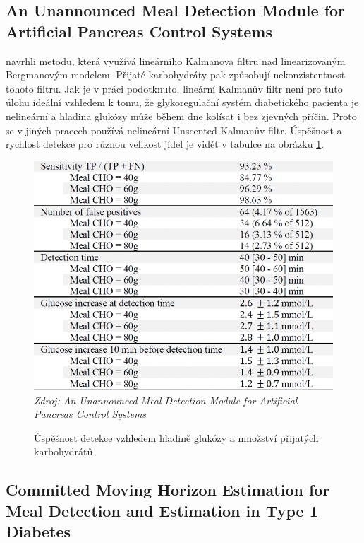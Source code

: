 \subsection{An Unannounced Meal Detection Module for Artificial Pancreas Control Systems}
\label{ch:nekonzistence}

\citet{Analyza.Nekonzistence} navrhli metodu, která využívá lineárního Kalmanova filtru nad linearizovaným Bergmanovým modelem. Přijaté karbohydráty pak způsobují nekonzistentnost tohoto filtru. Jak je v práci podotknuto, lineární Kalmanův filtr není pro tuto úlohu ideální vzhledem k tomu, že glykoregulační systém diabetického pacienta je nelineární a hladina glukózy může během dne kolísat i bez zjevných příčin. Proto se v jiných pracech používá nelineární Unscented Kalmanův filtr. Úspěšnost a rychlost detekce pro různou velikost jídel je vidět v tabulce na obrázku \ref{fig:nekonzistence}.

\begin{figure}[H]
\caption{Úspěšnost detekce vzhledem hladině glukózy a množství přijatých karbohydrátů}
\label{fig:nekonzistence}
\includegraphics[width=1\textwidth]{img/analyza/nekonzistence.png}\\
\textit{Zdroj: An Unannounced Meal Detection Module for Artificial Pancreas Control Systems \citep{Analyza.Nekonzistence}}
\end{figure}


\subsection{Committed Moving Horizon Estimation for Meal Detection and Estimation in Type 1 Diabetes}
\label{ch:horizon}


